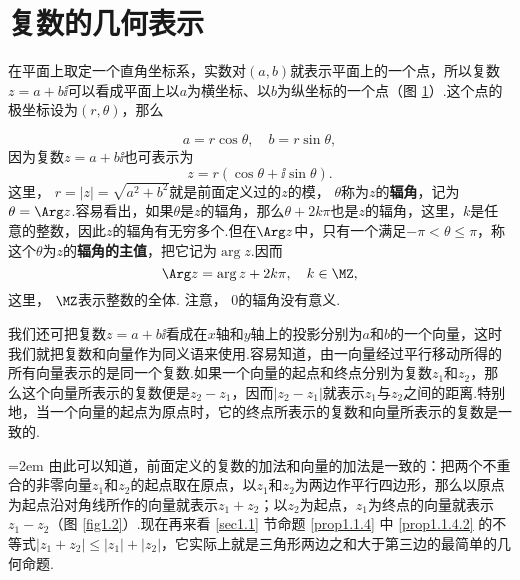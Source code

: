 \section{复数的几何表示\label{sec1.2}}
在平面上取定一个直角坐标系，实数对$(a,b)$就表示平面上的一个点，所以复数$z=a+b\ii$可以看成平面上以$a$为横坐标、以$b$为纵坐标的一个点（图 \ref{fig1.1}）.这个点的极坐标设为$(r,\theta)$，那么
\begin{figure}[!ht]
\centering
{}
\caption{}\label{fig1.1}
\end{figure}
\[a=r\cos\theta,\quad b=r\sin\theta,\]
因为复数$z=a+b\ii$也可表示为
\[z=r(\cos\theta+\ii\sin\theta).\]
这里， $r=|z|=\sqrt{a^2+b^2}$就是前面定义过的$z$的模， $\theta$称为$z$的\textbf{辐角}，记为$\theta=\Arg z$.容易看出，如果$\theta$是$z$的辐角，那么$\theta+2k\pi$也是$z$的辐角，这里，$k$是任意的整数，因此$z$的辐角有无穷多个.但在$\Arg z$中，只有一个满足$-\pi<\theta\le\pi$，称这个$\theta$为$z$的\textbf{辐角的主值}，把它记为$\arg z$.因而
\[\Arg z=\arg z+2k\pi,\quad k\in\MZ,\]
这里， $\MZ$表示整数的全体. 注意， $0$的辐角没有意义.

我们还可把复数$z=a+b\ii$看成在$x$轴和$y$轴上的投影分别为$a$和$b$的一个向量，这时我们就把复数和向量作为同义语来使用.容易知道，由一向量经过平行移动所得的所有向量表示的是同一个复数.如果一个向量的起点和终点分别为复数$z_1$和$z_2$，那么这个向量所表示的复数便是$z_2-z_1$，因而$|z_2-z_1|$就表示$z_1$与$z_2$之间的距离.特别地，当一个向量的起点为原点时，它的终点所表示的复数和向量所表示的复数是一致的.

\noindent\begin{minipage}{0.4\textwidth}
\centering
{}
\end{minipage}
\begin{minipage}{0.6\textwidth}\parindent=2em
由此可以知道，前面定义的复数的加法和向量的加法是一致的：把两个不重合的非零向量$z_1$和$z_2$的起点取在原点，以$z_1$和$z_2$为两边作平行四边形，那么以原点为起点沿对角线所作的向量就表示$z_1+z_2$；以$z_2$为起点，$z_1$为终点的向量就表示$z_1-z_2$（图 \ref{fig1.2}）.现在再来看 \ref{sec1.1} 节命题 \ref{prop1.1.4} 中 \ref{prop1.1.4.2} 的不等式$|z_1+z_2|\le|z_1|+|z_2|$，它实际上就是三角形两边之和大于第三边的最简单的几何命题.
\end{minipage}

